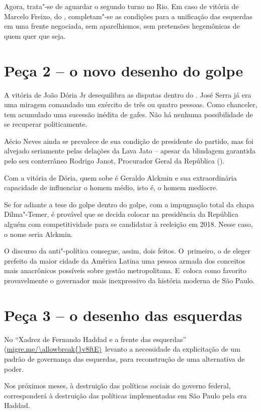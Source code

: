Agora, trata"-se de aguardar o segundo turno no Rio. Em caso de vitória
de Marcelo Freixo, do , completam"-se as condições para a unificação
das esquerdas em uma frente negociada, sem aparelhismos, sem pretensões
hegemônicas de quem quer que seja.

\section{Peça 2 -- o novo desenho do golpe}

A vitória de João Dória Jr desequilibra as disputas dentro do . José
Serra já era uma miragem comandado um exército de três ou quatro
pessoas. Como chanceler, tem acumulado uma sucessão inédita de gafes.
Não há nenhuma possibilidade de se recuperar politicamente.

Aécio Neves ainda se prevalece de sua condição de presidente do partido,
mas foi alvejado seriamente pelas delações da Lava Jato -- apesar da
blindagem garantida pelo seu conterrâneo Rodrigo Janot, Procurador Geral
da República ().

Com a vitória de Dória, quem sobe é Geraldo Alckmin e sua extraordinária
capacidade de influenciar o homem médio, isto é, o homem medíocre.

Se for adiante a tese do golpe dentro do golpe, com a impugnação total
da chapa Dilma"-Temer, é provável que se decida colocar na presidência da
República alguém com competitividade para se candidatar à reeleição em
2018. Nesse caso, o nome seria Alckmin.

O discurso da anti"-política consegue, assim, dois feitos. O~primeiro, o
de eleger prefeito da maior cidade da América Latina uma pessoa armada
dos conceitos mais anacrônicos possíveis sobre gestão metropolitana. E~coloca como favorito provavelmente o governador mais inexpressivo da
história moderna de São Paulo.

\section{Peça 3 -- o desenho das esquerdas}

No ``Xadrez de Fernando Haddad e a frente das esquerdas''
(\url{migre.me/\allowbreak{}v8ftE)}~levanto a necessidade da explicitação de
um padrão de governança das esquerdas, para reconstrução de uma
alternativa de poder.

Nos próximos meses, à destruição das políticas sociais do governo
federal, corresponderá à destruição das políticas implementadas em São
 Paulo pela era Haddad.

